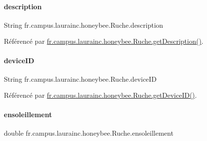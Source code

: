 \paragraph{\texorpdfstring{description}{description}}
{\footnotesize\ttfamily String fr.\+campus.\+laurainc.\+honeybee.\+Ruche.\+description\hspace{0.3cm}{\ttfamily [private]}}



Référencé par \hyperlink{classfr_1_1campus_1_1laurainc_1_1honeybee_1_1_ruche_ade21eb84d2a34d71cc2e89134b79cfd2}{fr.\+campus.\+laurainc.\+honeybee.\+Ruche.\+get\+Description()}.

\mbox{\label{classfr_1_1campus_1_1laurainc_1_1honeybee_1_1_ruche_aa9f9b410923f3c8b037c2c359a67a132}} 
\paragraph{\texorpdfstring{device\+ID}{deviceID}}
{\footnotesize\ttfamily String fr.\+campus.\+laurainc.\+honeybee.\+Ruche.\+device\+ID\hspace{0.3cm}{\ttfamily [private]}}



Référencé par \hyperlink{classfr_1_1campus_1_1laurainc_1_1honeybee_1_1_ruche_a0cbf5aacc51f6a0fc5bd9def0f1a32c7}{fr.\+campus.\+laurainc.\+honeybee.\+Ruche.\+get\+Device\+I\+D()}.

\mbox{\label{classfr_1_1campus_1_1laurainc_1_1honeybee_1_1_ruche_aebfc51ed0e12be0dddc7675884a8129b}} 
\paragraph{\texorpdfstring{ensoleillement}{ensoleillement}}
{\footnotesize\ttfamily double fr.\+campus.\+laurainc.\+honeybee.\+Ruche.\+ensoleillement\hspace{0.3cm}{\ttfamily [private]}}



